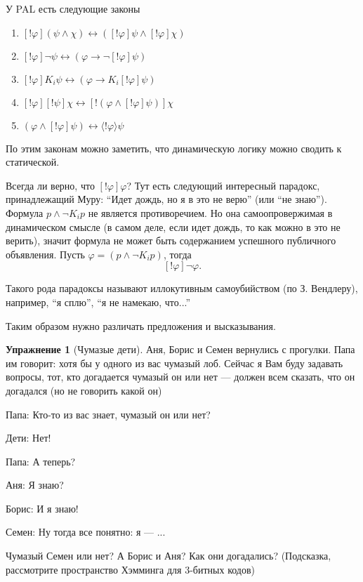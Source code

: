 \documentclass[openany]{book}
\theoremstyle{plain}
\theoremstyle{definition}
\newtheorem{xrc}{Упражнение}[]
\begin{document}

У PAL есть следующие законы
\begin{enumerate}
\item \( [!\varphi] (\psi \land \chi) \leftrightarrow ([!\varphi] \psi \land [!\varphi] \chi) \)
\item \( [!\varphi] \neg \psi \leftrightarrow (\varphi \to \neg [!\varphi] \psi) \)
\item \( [!\varphi] K_i \psi \leftrightarrow (\varphi \to K_i [!\varphi] \psi) \)
\item \( [!\varphi][!\psi] \chi \leftrightarrow [!(\varphi \land [!\varphi] \psi)]\chi \)
\item \( (\varphi \land [!\varphi] \psi) \leftrightarrow \langle !\varphi \rangle \psi \)
\end{enumerate}

По этим законам можно заметить, что динамическую логику можно сводить к статической.

Всегда ли верно, что \([!\varphi]\varphi\)? Тут есть следующий интересный парадокс, принадлежащий Муру: ``Идет дождь, но я в это не верю'' (или ``не знаю''). Формула \(p \land \neg K_i p\) не является противоречием. Но она самоопровержимая в динамическом смысле (в самом деле, если идет дождь, то как можно в это не верить), значит формула не может быть содержанием успешного публичного объявления. Пусть \(\varphi = (p \land \neg K_i p)\), тогда \[[!\varphi] \neg \varphi.\]

Такого рода парадоксы называют иллокутивным самоубийством (по З. Вендлеру), например, ``я сплю'', ``я не намекаю, что...''

Таким образом нужно различать предложения и высказывания.

\begin{xrc}[Чумазые дети]
Аня, Борис и Семен вернулись с прогулки. Папа им говорит: хотя бы у одного из вас чумазый лоб. Сейчас я Вам буду задавать вопросы, тот, кто догадается чумазый он или нет --- должен всем сказать, что он догадался (но не говорить какой он)

Папа: Кто-то из вас знает, чумазый он или нет?

Дети: Нет!

Папа: А теперь?

Аня: Я знаю?

Борис: И я знаю!

Семен: Ну тогда все понятно: я --- ...

Чумазый Семен или нет? А Борис и Аня? Как они догадались?
(Подсказка, рассмотрите пространство Хэмминга для \(3\)-битных кодов)
\end{xrc}
\end{document}
